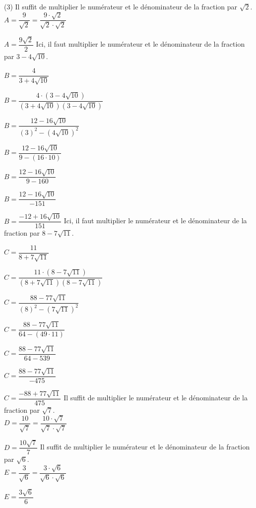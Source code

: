 \documentclass[a4paper,12pt]{report}
\begin{document}
\begin{cora}\phantom{ }


\begin{tasks}(3)
\task Il suffit de multiplier le numérateur et le dénominateur de la fraction par $\sqrt{2}$.\\$A=\dfrac{ 9 }{\sqrt{2}}=\dfrac{ 9 \cdot \sqrt{2}} {\sqrt{2} \cdot \sqrt{2}} $

\medskip
$A={{\dfrac{9\sqrt{2}}{2}}}$
\task Ici, il faut multiplier le numérateur et le dénominateur de la fraction par  $3-4\sqrt{10}$.

\medskip
$B=\dfrac{ 4 }{3+4\sqrt{10}}$

\medskip
$B=\dfrac{ 4\cdot (3-4\sqrt{10}) }{(3+4\sqrt{10})(3-4\sqrt{10})}$

\medskip
$B=\dfrac{ 12 -16\sqrt{10}}{(3)^2-\left(4\sqrt{10}\right)^2}$ 

\medskip
$B=\dfrac{ 12 -16\sqrt{10}}{9-(16\cdot10)}$

\medskip
$B=\dfrac{ 12 -16\sqrt{10}}{9-160}$

\medskip
$B=\dfrac{12 -16\sqrt{10}}{-151}$

\medskip
$B={{\dfrac{-12 +16\sqrt{10}}{151}}}$
\task Ici, il faut multiplier le numérateur et le dénominateur de la fraction par  $8-7\sqrt{11}$.

\medskip
$C=\dfrac{ 11 }{8+7\sqrt{11}}$

\medskip
$C=\dfrac{ 11\cdot (8-7\sqrt{11}) }{(8+7\sqrt{11})(8-7\sqrt{11})}$

\medskip
$C=\dfrac{ 88 -77\sqrt{11}}{(8)^2-\left(7\sqrt{11}\right)^2}$ 

\medskip
$C=\dfrac{ 88 -77\sqrt{11}}{64-(49\cdot11)}$

\medskip
$C=\dfrac{ 88 -77\sqrt{11}}{64-539}$

\medskip
$C=\dfrac{88 -77\sqrt{11}}{-475}$

\medskip
$C={{\dfrac{-88 +77\sqrt{11}}{475}}}$
\task Il suffit de multiplier le numérateur et le dénominateur de la fraction par $\sqrt{7}$.\\$D=\dfrac{ 10 }{\sqrt{7}}=\dfrac{ 10 \cdot \sqrt{7}} {\sqrt{7} \cdot \sqrt{7}} $

\medskip
$D={{\dfrac{10\sqrt{7}}{7}}}$
\task  Il suffit de multiplier le numérateur et le dénominateur de la fraction par $\sqrt{6}$.\\$E=\dfrac{ 3 }{\sqrt{6}}=\dfrac{ 3 \cdot \sqrt{6}} {\sqrt{6} \cdot \sqrt{6}} $

\medskip
$E=\dfrac{3\sqrt{6}}{6}$


\end{tasks}
\end{cora}
\end{document}
